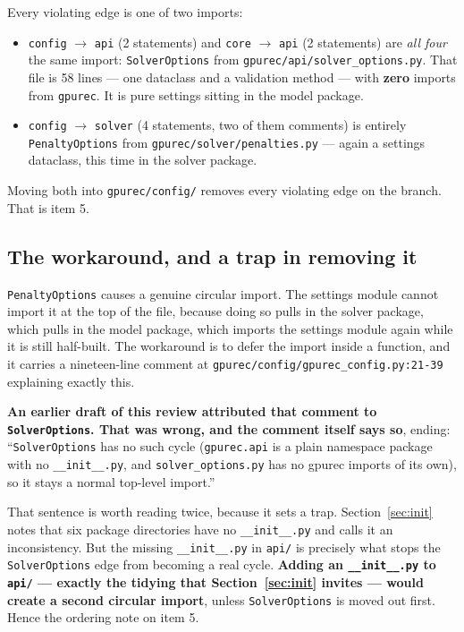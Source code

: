 \documentclass[11pt]{article}
\newcommand{\loc}[1]{\nolinkurl{#1}}
\newcommand{\dir}[1]{\nolinkurl{#1}}
\begin{document}
Every violating edge is one of two imports:

\begin{itemize}
  \item \texttt{config} $\rightarrow$ \texttt{api} (2 statements) and
        \texttt{core} $\rightarrow$ \texttt{api} (2 statements) are
        \emph{all four} the same import: \texttt{SolverOptions} from
        \dir{gpurec/api/solver\_options.py}.  That file is 58 lines --- one
        dataclass and a validation method --- with \textbf{zero} imports from
        \texttt{gpurec}.  It is pure settings sitting in the model package.
  \item \texttt{config} $\rightarrow$ \texttt{solver} (4 statements, two of
        them comments) is entirely \texttt{PenaltyOptions} from
        \dir{gpurec/solver/penalties.py} --- again a settings dataclass, this
        time in the solver package.
\end{itemize}

Moving both into \dir{gpurec/config/} removes every violating edge on the
branch.  That is item 5.

\subsection{The workaround, and a trap in removing it}
\label{sec:init-trap}

\texttt{PenaltyOptions} causes a genuine circular import.  The settings module
cannot import it at the top of the file, because doing so pulls in the solver
package, which pulls in the model package, which imports the settings module
again while it is still half-built.  The workaround is to defer the import
inside a function, and it carries a nineteen-line comment at
\loc{gpurec/config/gpurec\_config.py:21-39} explaining exactly this.

\textbf{An earlier draft of this review attributed that comment to
\texttt{SolverOptions}.  That was wrong, and the comment itself says so}, ending:
``\texttt{SolverOptions} has no such cycle (\texttt{gpurec.api} is a plain
namespace package with no \texttt{\_\_init\_\_.py}, and \texttt{solver\_options.py}
has no gpurec imports of its own), so it stays a normal top-level import.''

That sentence is worth reading twice, because it sets a trap.
Section~\ref{sec:init} notes that six package directories have no
\texttt{\_\_init\_\_.py} and calls it an inconsistency.  But the missing
\texttt{\_\_init\_\_.py} in \dir{api/} is precisely what stops the
\texttt{SolverOptions} edge from becoming a real cycle.  \textbf{Adding an
\texttt{\_\_init\_\_.py} to \dir{api/} --- exactly the tidying that
Section~\ref{sec:init} invites --- would create a second circular import},
unless \texttt{SolverOptions} is moved out first.  Hence the ordering note on
item 5.
\end{document}
